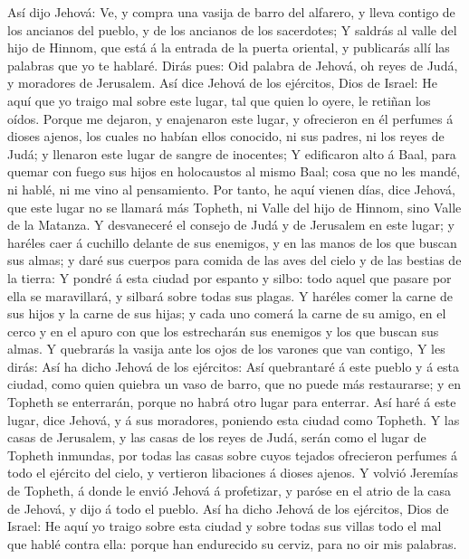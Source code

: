  Así dijo Jehová: Ve, y compra una vasija de barro del
alfarero, y lleva contigo de los ancianos del pueblo, y de los ancianos
de los sacerdotes;  Y saldrás al valle del hijo de Hinnom,
que está á la entrada de la puerta oriental, y publicarás allí las
palabras que yo te hablaré.  Dirás pues: Oid palabra de
Jehová, oh reyes de Judá, y moradores de Jerusalem. Así dice Jehová de
los ejércitos, Dios de Israel: He aquí que yo traigo mal sobre este
lugar, tal que quien lo oyere, le retiñan los oídos.  Porque
me dejaron, y enajenaron este lugar, y ofrecieron en él perfumes á
dioses ajenos, los cuales no habían ellos conocido, ni sus padres, ni
los reyes de Judá; y llenaron este lugar de sangre de inocentes;
 Y edificaron alto á Baal, para quemar con fuego sus hijos
en holocaustos al mismo Baal; cosa que no les mandé, ni hablé, ni me
vino al pensamiento.  Por tanto, he aquí vienen días, dice
Jehová, que este lugar no se llamará más Topheth, ni Valle del hijo de
Hinnom, sino Valle de la Matanza.  Y desvaneceré el consejo
de Judá y de Jerusalem en este lugar; y haréles caer á cuchillo delante
de sus enemigos, y en las manos de los que buscan sus almas; y daré sus
cuerpos para comida de las aves del cielo y de las bestias de la tierra:
 Y pondré á esta ciudad por espanto y silbo: todo aquel que
pasare por ella se maravillará, y silbará sobre todas sus plagas.
 Y haréles comer la carne de sus hijos y la carne de sus
hijas; y cada uno comerá la carne de su amigo, en el cerco y en el apuro
con que los estrecharán sus enemigos y los que buscan sus almas.
 Y quebrarás la vasija ante los ojos de los varones que van
contigo,  Y les dirás: Así ha dicho Jehová de los
ejércitos: Así quebrantaré á este pueblo y á esta ciudad, como quien
quiebra un vaso de barro, que no puede más restaurarse; y en Topheth se
enterrarán, porque no habrá otro lugar para enterrar.  Así
haré á este lugar, dice Jehová, y á sus moradores, poniendo esta ciudad
como Topheth.  Y las casas de Jerusalem, y las casas de los
reyes de Judá, serán como el lugar de Topheth inmundas, por todas las
casas sobre cuyos tejados ofrecieron perfumes á todo el ejército del
cielo, y vertieron libaciones á dioses ajenos.  Y volvió
Jeremías de Topheth, á donde le envió Jehová á profetizar, y paróse en
el atrio de la casa de Jehová, y dijo á todo el pueblo. 
Así ha dicho Jehová de los ejércitos, Dios de Israel: He aquí yo traigo
sobre esta ciudad y sobre todas sus villas todo el mal que hablé contra
ella: porque han endurecido su cerviz, para no oir mis palabras.


